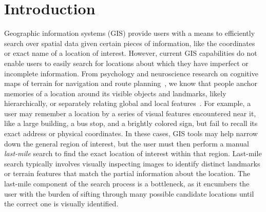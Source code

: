 \section{Introduction}
\label{section:introduction}
Geographic information systems (GIS) provide users with a means to efficiently search over spatial data given certain pieces of information, like the coordinates or exact name of a location of interest. 
However, current GIS capabilities do not enable users to easily search for locations about which they have imperfect or incomplete information. 
From psychology and neuroscience research on cognitive maps of terrain for navigation and route planning~\cite{Weisberg2016, Miller2013, Keatley2021}, we know that people anchor memories of a location around its visible objects and landmarks, likely hierarchically, or separately relating global and local features~\cite{Weisberg2016}. 
For example, a user may remember a location by a series of visual features encountered near it, like a large building, a bus stop, and a brightly colored sign, but fail to recall its exact address or physical coordinates. 
In these cases, GIS tools may help narrow down the general region of interest, but the user must then perform a manual \emph{last-mile} search to find the exact location of interest within that region. 
Last-mile search typically involves visually inspecting images to identify distinct landmarks or terrain features that match the partial information about the location. 
The last-mile component of the search process is a bottleneck, as it encumbers the user with the burden of sifting through many possible candidate locations until the correct one is visually identified. 

